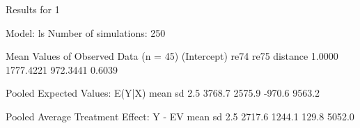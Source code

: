 \begin{enumerate}
\begin{Schunk}
\begin{Soutput}
Results for 1 

  Model: ls 
  Number of simulations: 250 

Mean Values of Observed Data (n = 45) 
(Intercept)        re74        re75    distance 
     1.0000   1777.4221    972.3441      0.6039 

Pooled Expected Values: E(Y|X)
  mean     sd   2.5%  97.5% 
3768.7 2575.9 -970.6 9563.2 

Pooled Average Treatment Effect: Y - EV
  mean     sd   2.5%  97.5% 
2717.6 1244.1  129.8 5052.0 


\end{Soutput}
\end{Schunk}
  
\end{enumerate}

